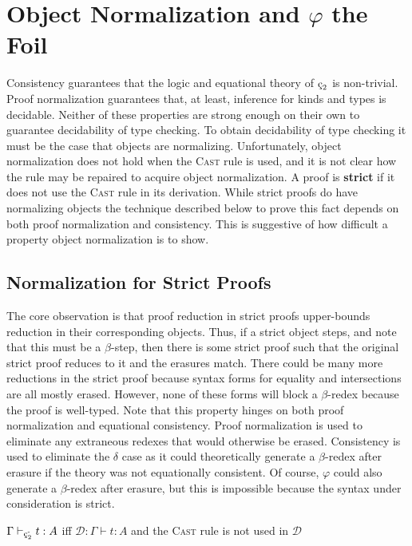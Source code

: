 \chapter{Object Normalization and \texorpdfstring{$\varphi$}{Phi} the Foil}
\label{chap:5}

Consistency guarantees that the logic and equational theory of $\ced$ is non-trivial.
Proof normalization guarantees that, at least, inference for kinds and types is decidable.
Neither of these properties are strong enough on their own to guarantee decidability of type checking.
To obtain decidability of type checking it must be the case that objects are normalizing.
Unfortunately, object normalization does not hold when the \textsc{Cast} rule is used, and it is not clear how the rule may be repaired to acquire object normalization.
A proof is \textbf{strict} if it does not use the \textsc{Cast} rule in its derivation.
While strict proofs do have normalizing objects the technique described below to prove this fact depends on both proof normalization and consistency.
This is suggestive of how difficult a property object normalization is to show.

\section{Normalization for Strict Proofs}

The core observation is that proof reduction in strict proofs upper-bounds reduction in their corresponding objects.
Thus, if a strict object steps, and note that this must be a $\beta$-step, then there is some strict proof such that the original strict proof reduces to it and the erasures match.
There could be many more reductions in the strict proof because syntax forms for equality and intersections are all mostly erased.
However, none of these forms will block a $\beta$-redex because the proof is well-typed.
Note that this property hinges on both proof normalization and equational consistency.
Proof normalization is used to eliminate any extraneous redexes that would otherwise be erased.
Consistency is used to eliminate the $\delta$ case as it could theoretically generate a $\beta$-redex after erasure if the theory was not equationally consistent.
Of course, $\varphi$ could also generate a $\beta$-redex after erasure, but this is impossible because the syntax under consideration is strict.

\begin{definition}
    $\Gamma \vdash_{\ced^\text{-}} t : A$ iff $\mathcal{D} : \Gamma \vdash t : A$ and the \textnormal{\textsc{Cast}} rule is not used in $\mathcal{D}$
\end{definition}

